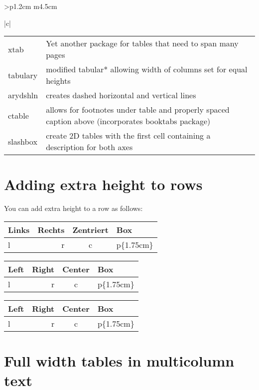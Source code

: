 \begin{tabular}{>{\bfseries}p{1.2cm} m{4.5cm}}
\begin{tabular}[t]{|c|}
\begin{longtable}
\begin{longtable}{lp{7cm}}
xtab &Yet another package for tables that need to span many pages\\

tabulary &modified tabular* allowing width of columns set for equal heights\\

arydshln &creates dashed horizontal and vertical lines\\

ctable &allows for footnotes under table and properly spaced caption above (incorporates booktabs package)\\

slashbox &create 2D tables with the first cell containing a description for both axes\\
\bottomrule
\end{longtable}


\clearpage

\section{Adding extra height to rows}

You can add extra height to a row as follows:

\begin{teXXX}
\setlength\extrarowheight{2pt}
\begin{tabular}{|l|r|c|p{1.75cm}|}\hline
  Links & Rechts & Zentriert & Box\\\hline
  \rowcolor{cyan!40}
  l & r & c & p\{1.75cm\}\\\hline
\end{tabular}
\end{teXXX}

\bigskip

{
\setlength\extrarowheight{2pt}
\begin{tabular}{|l|r|c|p{1.75cm}|}\hline
Left & Right & Center & Box\\\hline
\rowcolor{cyan!40}
l & r & c & p\{1.75cm\}\\\hline
\end{tabular}
}
{
\setlength\extrarowheight{0pt}
\begin{tabular}{|l|r|c|p{1.75cm}|}\hline
Left & Right & Center & Box\\\hline
\rowcolor{cyan!40}
l & r & c & p\{1.75cm\}\\\hline
\end{tabular}
}

\section{Full width tables in multicolumn text}



\end{longtable}
\end{tabular}
\end{tabular}
